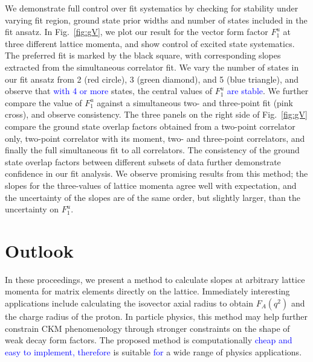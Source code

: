 \documentclass{PoS}
\newcommand{\kno}[1]{\textcolor{blue}{#1}}
\begin{document}
We demonstrate full control over fit systematics by checking for stability under varying fit region, ground state prior widths and number of states included in the fit ansatz. In Fig.~\ref{fig:gV}, we plot our result for the vector form factor $F^u_1$ at three different lattice momenta, and show control of excited state systematics.  The preferred fit is marked by the black square, with corresponding slopes extracted from the simultaneous correlator fit. We vary the number of states in our fit ansatz from 2 (red circle), 3 (green diamond), and 5 (blue triangle), and observe that \kno{with 4 or more}  states, the central values of $F_1^u$ \kno{are stable}. We further compare the value of $F_1^u$ against a simultaneous two- and three-point fit (pink cross), and observe consistency. The three panels on the right side of Fig.~\ref{fig:gV} compare the ground state overlap factors obtained from a two-point correlator only, two-point correlator with its moment, two- and three-point correlators, and finally the full simultaneous fit to all correlators.  The consistency of the ground state overlap factors between different subsets of data further demonstrate confidence in our fit analysis. We observe promising results from this method; the slopes for the three-values of lattice momenta agree well with expectation, and the uncertainty of the slopes are of the same order, but slightly larger, than the uncertainty on $F_1^u$.

\section{Outlook}
In these proceedings, we present a method to calculate slopes at arbitrary lattice momenta for matrix elements directly on the lattice.  Immediately interesting applications include calculating the isovector axial radius to obtain $F_A(q^2)$ and the charge radius of the proton.  In particle physics, this method may help further constrain CKM phenomenology through stronger constraints on the shape of weak decay form factors. The proposed method is computationally \kno{ cheap and  easy to implement, therefore} is suitable \kno{for} a wide range of physics applications.

\end{document}
